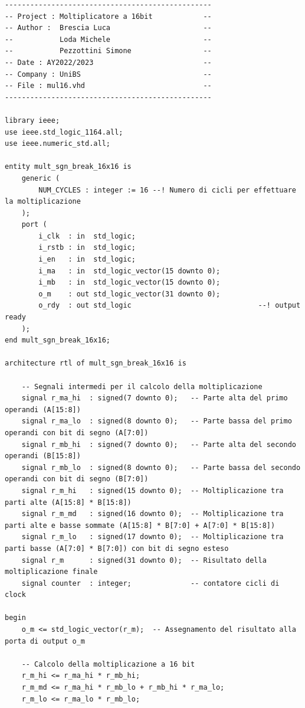 \documentclass[titlepage]{report}
\begin{document}
		\begin{lstlisting}[caption={\textbf{mul16.vhd} - architettura del motiplicatore a 16 bit}, label={lst:mul16_process}]
-------------------------------------------------
-- Project : Moltiplicatore a 16bit            --
-- Author :  Brescia Luca                      -- 
--           Loda Michele                      --
--           Pezzottini Simone                 --
-- Date : AY2022/2023                          --
-- Company : UniBS                             --
-- File : mul16.vhd                            --
-------------------------------------------------

library ieee;
use ieee.std_logic_1164.all;
use ieee.numeric_std.all;

entity mult_sgn_break_16x16 is
	generic (
		NUM_CYCLES : integer := 16 --! Numero di cicli per effettuare la moltiplicazione
	);
	port ( 
		i_clk  : in  std_logic;
		i_rstb : in  std_logic;
		i_en   : in  std_logic;
		i_ma   : in  std_logic_vector(15 downto 0);
		i_mb   : in  std_logic_vector(15 downto 0);
		o_m    : out std_logic_vector(31 downto 0);
		o_rdy  : out std_logic								--! output ready
	);
end mult_sgn_break_16x16;

architecture rtl of mult_sgn_break_16x16 is

	-- Segnali intermedi per il calcolo della moltiplicazione
	signal r_ma_hi  : signed(7 downto 0);   -- Parte alta del primo operandi (A[15:8])
	signal r_ma_lo  : signed(8 downto 0);   -- Parte bassa del primo operandi con bit di segno (A[7:0])
	signal r_mb_hi  : signed(7 downto 0);   -- Parte alta del secondo operandi (B[15:8])
	signal r_mb_lo  : signed(8 downto 0);   -- Parte bassa del secondo operandi con bit di segno (B[7:0])
	signal r_m_hi   : signed(15 downto 0);  -- Moltiplicazione tra parti alte (A[15:8] * B[15:8])
	signal r_m_md   : signed(16 downto 0);  -- Moltiplicazione tra parti alte e basse sommate (A[15:8] * B[7:0] + A[7:0] * B[15:8])
	signal r_m_lo   : signed(17 downto 0);  -- Moltiplicazione tra parti basse (A[7:0] * B[7:0]) con bit di segno esteso
	signal r_m      : signed(31 downto 0);  -- Risultato della moltiplicazione finale
	signal counter  : integer;              -- contatore cicli di clock

begin
	o_m <= std_logic_vector(r_m);  -- Assegnamento del risultato alla porta di output o_m

	-- Calcolo della moltiplicazione a 16 bit
	r_m_hi <= r_ma_hi * r_mb_hi;
	r_m_md <= r_ma_hi * r_mb_lo + r_mb_hi * r_ma_lo;
	r_m_lo <= r_ma_lo * r_mb_lo;


\end{lstlisting}
\end{document}
